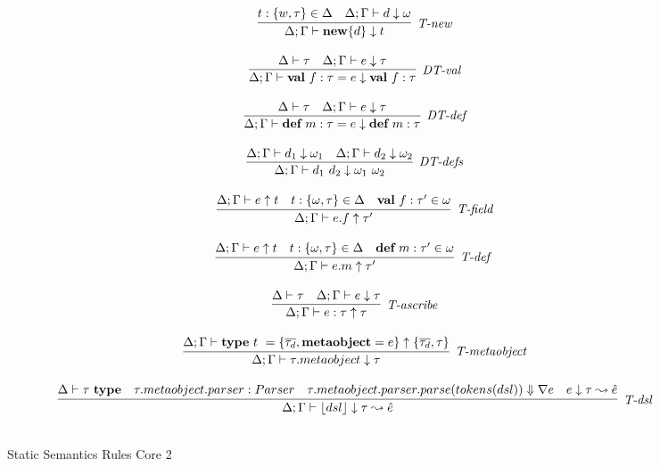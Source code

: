 \begin{figure}
\centering
\[
\begin{array}{c}

\infer[\textit{T-new}]
	{\Delta; \Gamma \vdash \keyw{new} \{ d \} \downarrow  t }
	{ t:\{w,\tau\} \in \Delta & \Delta;\Gamma \vdash d \downarrow \omega} \\[3ex]


\infer[\textit{DT-val}]
	{\Delta; \Gamma \vdash \keyw{val}~ f:\tau = e \downarrow \keyw{val}~ f:\tau }
	{\Delta \vdash \tau &\Delta; \Gamma \vdash e \downarrow \tau  } \\[3ex]
	
\infer[\textit{DT-def}]
	{\Delta; \Gamma \vdash \keyw{def}~ m:\tau = e \downarrow \keyw{def}~ m:\tau }
	{\Delta \vdash \tau  & \Delta; \Gamma \vdash e  \downarrow \tau } \\[3ex]

	
\infer[\textit{DT-defs}]
	{\Delta; \Gamma \vdash d_1\ d_2 \downarrow \omega_1\ \omega_2 }
	{\Delta; \Gamma \vdash d_1 \downarrow \omega_1 &  \Delta; \Gamma \vdash d_2 \downarrow \omega_2 } \\[3ex]


\infer[\textit{T-field}]
	{\Delta; \Gamma \vdash  e.f \uparrow \tau'} 
	{\Delta; \Gamma \vdash e \uparrow t & t:\{\omega, \tau\}\in \Delta & \keyw{val}\ f:\tau' \in \omega  }\\[3ex]

 
\infer[\textit{T-def }]
	{\Delta; \Gamma \vdash  e.m \uparrow\tau'} 
	{\Delta; \Gamma \vdash e \uparrow t & t: \{\omega, \tau\} \in \Delta & \keyw{def}\ m:\tau' \in \omega }\\[3ex]

\infer[\textit{T-ascribe}]
	{\Delta; \Gamma  \vdash  e:\tau \uparrow \tau }
	{\Delta \vdash \tau & \Delta; \Gamma \vdash e \downarrow \tau } \\[3ex]


\infer[\textit{T-metaobject}]
        {\Delta; \Gamma \vdash \tau.metaobject \downarrow \tau   }
	{\Delta; \Gamma \vdash  \keyw{type}~ t~=\{\overline{\tau_d}, \keyw{metaobject}=e\} \uparrow \{\overline{\tau_d},\tau\}} \\[3ex]

\infer[\textit{T-dsl}]
        {\Delta; \Gamma \vdash \lfloor dsl \rfloor \downarrow \tau \leadsto \hat{e} }
	{\Delta \vdash \tau\ \keyw{type}& \tau.metaobject.parser:Parser & \tau.metaobject.parser.parse(tokens(dsl)) \Downarrow \nabla e & e\downarrow \tau \leadsto \hat{e}} \\[3ex]





\end{array}
\]
\caption{Static Semantics Rules Core 2}
\end{figure}
